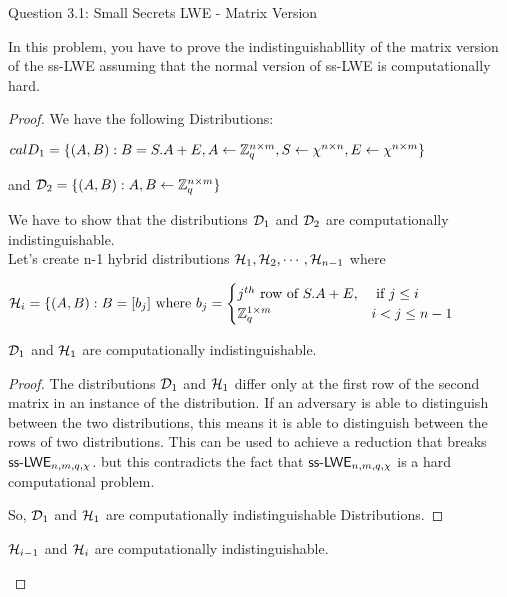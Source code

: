 \begin{solution}{Question 3.1: Small Secrets LWE - Matrix Version}\label{ques:31}
    \begin{question}
    In this problem, you have to prove the indistinguishabllity of the matrix version of the ss-LWE assuming that the normal version of ss-LWE is computationally hard. 
    \end{question}
    \tcblower{}
    
    \begin{proof}
    We have the following Distributions:

    $calD_{1} = \{ (A,B): B = S . A + E, A \leftarrow \mathbb{Z}_q^{n\times m}, S \leftarrow \chi^{n\times n}, E \leftarrow \chi^{n\times m}\}$

    and $\mathcal{D}_{2} = \{ (A,B):  A,B \leftarrow \mathbb{Z}_q^{n\times m} \}$

    We have to show that the distributions $\mathcal{D}_1$ and $\mathcal{D}_2$ are computationally indistinguishable.\\
    
    Let's create n-1 hybrid distributions $\mathcal{H}_1,\mathcal{H}_2,\cdots,\mathcal{H}_{n-1}$ where 

    $\mathcal{H}_i = \{ (A,B): B = [b_j] \text{ where }b_j = 
    \begin{cases}
    j^{th} \text{ row of } S.A+E, &\text{ if } j \leq i\\
    \mathbb{Z}_q^{1\times m} &i < j\leq n-1 
    \end{cases}$

    \begin{claim}
    $\mathcal{D}_1$ and $\mathcal{H}_1$ are computationally indistinguishable.
    \end{claim}

    \begin{proof}
        The distributions $\mathcal{D}_1$ and $\mathcal{H}_1$ differ only at the first row of the second matrix in an instance of the distribution. If an adversary is able to distinguish between the two distributions,  this means it is able to distinguish between the rows of two distributions. This can be used to achieve a reduction that breaks $\mathsf{ss\text{-}LWE}_{n,m,q,\chi}$. but this contradicts the fact that $\mathsf{ss\text{-}LWE}_{n,m,q,\chi}$ is a hard computational problem.

        So, $\mathcal{D}_1$ and $\mathcal{H}_1$ are computationally indistinguishable Distributions.
        
    \end{proof}

    \begin{claim}
    $\mathcal{H}_{i-1}$ and $\mathcal{H}_{i}$ are computationally indistinguishable.
    \end{claim}


\end{proof}
\end{solution}
